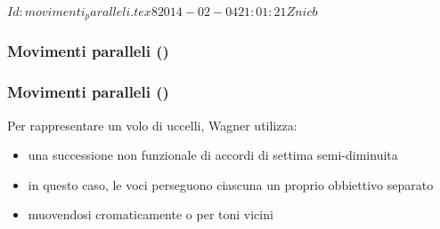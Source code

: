 %
%
\svnInfo $Id: movimenti_paralleli.tex 8 2014-02-04 21:01:21Z nicb $

\setcounter{ms}{0}
\begin{frame}
    \frametitle{Movimenti paralleli ()}

    \begin{center}
        \begin{figure}
            \caption{}
        \end{figure}
    \end{center}

\end{frame}

\begin{frame}
    \frametitle{Movimenti paralleli ()}

    Per rappresentare un volo di uccelli, Wagner utilizza:

    \begin{itemize}
        \item una successione non funzionale di accordi di settima semi-diminuita
        \item in questo caso, le voci perseguono ciascuna un proprio obbiettivo separato
        \item muovendosi cromaticamente o per toni vicini
    \end{itemize}

\end{frame}

